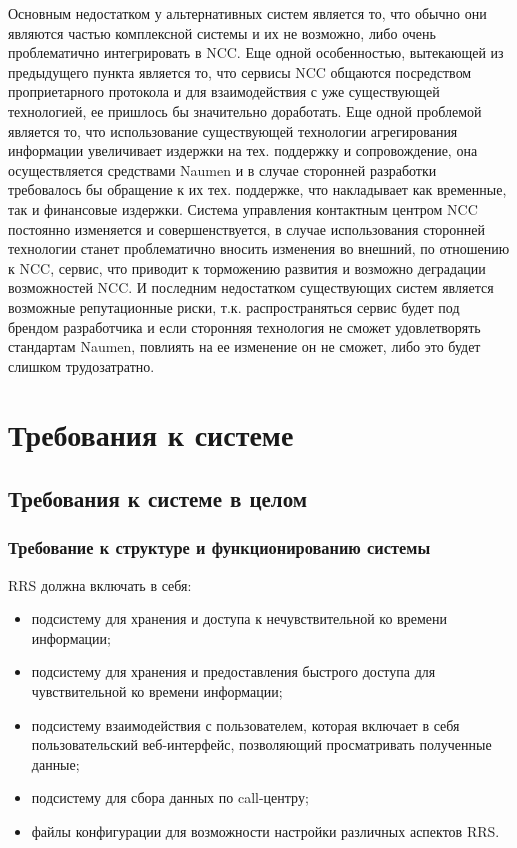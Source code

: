 Основным недостатком у альтернативных систем является то,
что обычно они являются частью комплексной системы и их не возможно,
либо очень проблематично интегрировать в NCC.
Еще одной особенностью, вытекающей из предыдущего пункта является то,
что сервисы NCC общаются посредством проприетарного протокола и для взаимодействия
с уже существующей технологией, ее пришлось бы значительно доработать.
Еще одной проблемой является то, что использование существующей технологии агрегирования информации
увеличивает издержки на тех. поддержку и сопровождение,
она осуществляется средствами Naumen и в случае сторонней разработки требовалось бы обращение
к их тех. поддержке, что накладывает как временные, так и финансовые издержки.
Система управления контактным центром NCC постоянно изменяется и совершенствуется,
в случае использования сторонней технологии станет проблематично вносить изменения во внешний,
по отношению к NCC, сервис, что приводит к торможению развития и возможно деградации возможностей NCC.
И последним недостатком существующих систем является возможные репутационные риски,
т.к. распространяться сервис будет под брендом разработчика
и если сторонняя технология не сможет удовлетворять стандартам Naumen,
повлиять на ее изменение он не сможет, либо это будет слишком трудозатратно.

\section{Требования к системе}

\subsection{Требования к системе в целом}

\subsubsection{Требование к структуре и функционированию системы} %

RRS должна включать в себя:
\begin{itemize}
    \item подсистему для хранения и доступа к нечувствительной ко времени информации;
    \item подсистему для хранения и предоставления быстрого доступа для чувствительной ко времени информации;
    \item подсистему взаимодействия с пользователем, которая включает в себя пользовательский веб-интерфейс, позволяющий просматривать полученные данные;
    \item подсистему для сбора данных по call-центру;
    \item файлы конфигурации для возможности настройки различных аспектов RRS\@.
\end{itemize}

